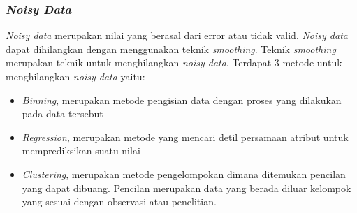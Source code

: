\subsubsection{\textsl{Noisy Data}}
\textsl{Noisy data} merupakan nilai yang berasal dari error atau tidak valid. \textsl{Noisy data} dapat dihilangkan dengan menggunakan teknik \textsl{smoothing}. Teknik \textsl{smoothing} merupakan teknik untuk menghilangkan \textsl{noisy data}. Terdapat 3 metode untuk menghilangkan \textsl{noisy data} yaitu:
	\label{teknikBinning}
	\begin{itemize}
		\item \textsl{Binning}, merupakan metode pengisian data dengan proses yang dilakukan pada data tersebut
		\item \textsl{Regression}, merupakan metode yang mencari detil persamaan atribut untuk memprediksikan suatu nilai
		\item	\textsl{Clustering}, merupakan metode pengelompokan dimana ditemukan pencilan yang dapat dibuang. Pencilan merupakan data yang berada diluar kelompok yang sesuai dengan observasi atau penelitian.
	\end{itemize}




